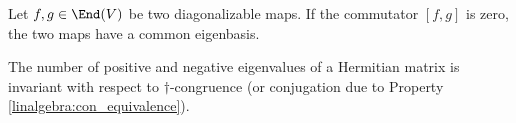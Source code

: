     \begin{property}[Commutator]
        Let $f,g\in\End(V)$ be two diagonalizable maps. If the commutator $[f,g]$ is zero, the two maps have a common eigenbasis.
    \end{property}

    \begin{theorem}\label{linalgebra:sylvester}
        The number of positive and negative eigenvalues of a Hermitian matrix is invariant with respect to $\dag$-congruence (or conjugation due to Property \ref{linalgebra:con_equivalence}).
    \end{theorem}